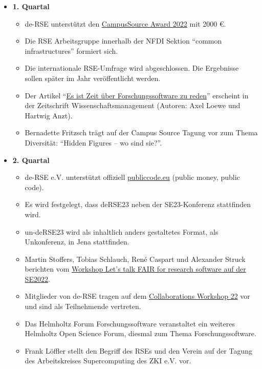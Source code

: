 \begin{itemize}
 \item \textbf{1. Quartal}
   \begin{itemize}
     \item de-RSE unterstützt den \href{https://ev.campussource.de/publikationen/csa2022/}{CampusSource Award 2022} mit 2000 €.
     \item Die RSE Arbeitsgruppe innerhalb der NFDI Sektion "`common infrastructures"' formiert sich.
     \item Die internationale RSE-Umfrage wird abgeschlossen. Die Ergebnisse sollen später im Jahr veröffentlicht werden.
     \item Der Artikel "`\href{https://www.wissenschaftsmanagement.de/news/es-ist-zeit-ueber-forschungssoftware-zu-reden}{Es ist Zeit über Forschungssoftware zu reden}"' erscheint in der Zeitschrift Wissenschaftsmanagement (Autoren: Axel Loewe und Hartwig Anzt).
     \item Bernadette Fritzsch trägt auf der Campus Source Tagung vor zum Thema Diversität: "`Hidden Figures – wo sind sie?"'.

   \end{itemize}\clearpage
 \item \textbf{2. Quartal}
   \begin{itemize}
    \item de-RSE e.V. unterstützt offiziell \href{https://publiccode.eu}{publiccode.eu} (public money, public code).
    \item Es wird festgelegt, dass deRSE23 neben der SE23-Konferenz stattfinden wird.
    \item un-deRSE23 wird als inhaltlich anders gestaltetes Format, als Unkonferenz, in Jena stattfinden.
    \item Martin Stoffers, Tobias Schlauch, René Caspart und Alexander Struck berichten vom \href{https://de-rse.org/blog/2022/06/02/recap-workshop-lets-talk-fair-for-research-software-at-se2022.html}{Workshop Let's talk FAIR for research software auf der SE2022}.
    \item Mitglieder von de-RSE tragen auf dem \href{https://software.ac.uk/cw22/agenda}{Collaborations Workshop 22} vor und sind als Teilnehmende vertreten.
    \item Das Helmholtz Forum Forschungssoftware veranstaltet ein weiteres Helmholtz Open Science Forum, diesmal zum Thema Forschungssoftware.
    \item Frank Löffler stellt den Begriff des RSEs und den Verein auf der Tagung des Arbeitskreises Supercomputing des ZKI e.V. vor.


\end{itemize}
\end{itemize}
